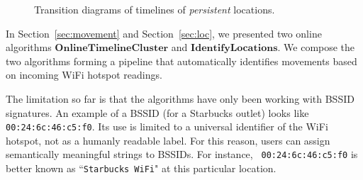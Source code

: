 \begin{figure}[t]
    \centering
    \caption{Transition diagrams of timelines of {\em persistent} 
    locations.}
    \label{fig:loc2}
\end{figure}

In Section~\ref{sec:movement} and Section~\ref{sec:loc}, we presented two online
algorithms $\mathbf{OnlineTimelineCluster}$ and $\mathbf{IdentifyLocations}$.
We compose the two algorithms forming a pipeline that automatically identifies
movements based on incoming WiFi hotspot readings.

The limitation so far is that the algorithms have only been working with
BSSID signatures.  An example of a BSSID (for a Starbucks outlet) looks like 
{\tt 00:24:6c:46:c5:f0}.  Its use is limited to a universal identifier of the
WiFi hotspot, not as a humanly readable label.  For this reason, users can
assign semantically meaningful strings to BSSIDs.  For instance, {\tt
00:24:6c:46:c5:f0} is better known as ``{\tt Starbucks WiFi}" at this particular
location.

